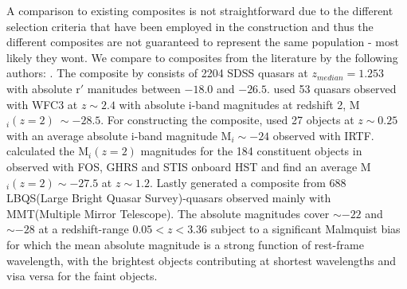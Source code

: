 \documentclass{aa}    %
\begin{document}
A comparison to existing composites is not straightforward due to the different selection criteria that have been employed in the construction and thus the different composites are not guaranteed to represent the same population - most likely they wont. We compare to composites from the literature by the following authors: \cite{VandenBerk2001, Lusso2015, Glikman2006, Telfer2002, Francis1991}. The composite by \cite{VandenBerk2001} consists of 2204 SDSS quasars at $z_{median} = 1.253$ with absolute r$'$ manitudes between $-18.0$ and $-26.5$. \cite{Lusso2015} used 53 quasars observed with WFC3 at $z \sim 2.4$ with absolute i-band magnitudes at redshift 2, M$_i(z=2) ~\sim -28.5$. For constructing the composite, \cite{Glikman2006}  used 27 objects at $z \sim 0.25$ with an average absolute i-band magnitude M$_i \sim -24$ observed with IRTF. \cite{Lusso2015} calculated the M$_i(z=2)$ magnitudes for the 184 constituent objects in \cite{Telfer2002} observed with FOS, GHRS and STIS onboard HST and find an average M$_i(z=2) \sim -27.5$ at $z \sim 1.2$. Lastly \cite{Francis1991} generated a composite from  688 LBQS(Large Bright Quasar Survey)-quasars observed mainly with MMT(Multiple Mirror Telescope). The absolute magnitudes cover $\sim -22$ and $\sim -28$ at a redshift-range $0.05 < z  < 3.36$ subject to a significant Malmquist bias for which the mean absolute magnitude is a strong function of rest-frame wavelength, with the brightest objects contributing at shortest wavelengths and visa versa for the faint objects. 
\end{document}
